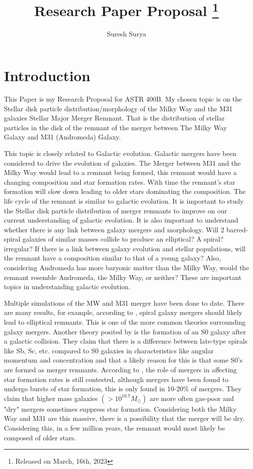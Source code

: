 \documentclass[linenumbers, preprint, times]{aastex631}
\begin{document}
\nolinenumbers
\title{Research Paper Proposal
\footnote{Released on March, 16th, 2023}}

\author{Suresh Surya}
\section{Introduction} \label{sec:style}
This Paper is my Research Proposal for ASTR 400B. My chosen topic is
on the Stellar disk particle distribution/morphology of the Milky Way and the M31 galaxies
Stellar Major Merger Remnant. That is the distribution of stellar particles in the disk of the
remnant of the merger between The Milky Way Galaxy and M31 (Andromeda) Galaxy.\par
This topic is closely related to Galactic evolution. Galactic mergers have been considered to drive the evolution of galaxies.  The Merger between M31 and the Milky Way would lead to a remnant being formed, this remnant would have a changing composition and star formation rates. 
With time the remnant's star formation will slow down leading to older stars dominating the composition. The life cycle of
the remnant is similar to galactic evolution. It is important to study the Stellar disk particle distribution of merger
remnants to improve on our current understanding of galactic evolution. It is also important to understand whether there is 
any link between galaxy mergers and morphology. Will 2 barred-spiral galaxies of similar masses collide to produce an elliptical? A spiral? irregular? If there is a link between galaxy evolution and stellar populations, will the
remnant have a composition similar to that of a young galaxy? Also, considering Andromeda has more baryonic matter than the Milky Way, would the remnant resemble Andromeda, the Milky Way, or neither? These are important topics in understanding
galactic evolution.\par
Multiple simulations of the MW and M31 merger have been done to date. There are many results, for example, according to \citet{Toomre_1972}, spiral galaxy mergers should likely lead to elliptical remnants. This is one of the more common theories surrounding galaxy mergers. Another theory posited by \citet{Querejeta_2015} is the formation of an S0 galaxy after a galactic collision. They claim that there is a difference between late-type spirals like Sb, Sc, etc. compared to S0 galaxies in characteristics like angular momentum and concentration and that a likely reason for this is that some S0's are formed as merger remnants. According to \citet{Pearson_2019}, the role of mergers in affecting star formation rates is still contested, although mergers have been found to undergo bursts of star formation, this is only found in 10-20\% of mergers. They claim that higher mass galaxies $(> 10^{10.7}M_\odot)$ are more often gas-poor and "dry" mergers sometimes suppress star formation. Considering both the Milky Way and M31 are this massive, there is a possibility that the merger will be dry. Considering this, in a few million years, the remnant would most likely be composed of older stars.\par
\end{document}
